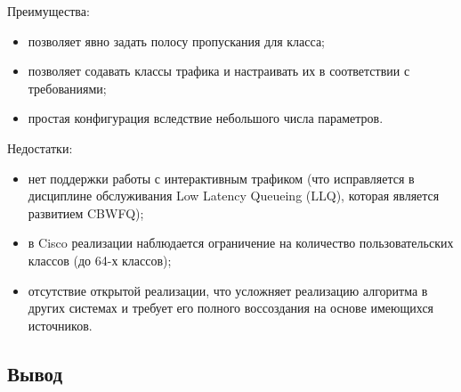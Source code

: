 	Преимущества:
	\begin{itemize}
		\item позволяет явно задать полосу пропускания для класса;
		\item позволяет содавать классы трафика и настраивать их в соответствии с требованиями;
		\item простая конфигурация вследствие небольшого числа параметров.\cite{Vagesna}\cite{ciscoguide}
	\end{itemize}

	Недостатки:
	\begin{itemize}
		\item нет поддержки работы с интерактивным трафиком (что исправляется в дисциплине обслуживания Low Latency Queueing (LLQ),
		которая является развитием CBWFQ);
		\item в Cisco реализации наблюдается ограничение на количество пользовательских классов (до 64-х классов);\cite{Vagesna}
		\item отсутствие открытой реализации, что усложняет реализацию алгоритма в других системах и требует его полного воссоздания
		на основе имеющихся источников.
	\end{itemize}

	\subsection{Вывод}

